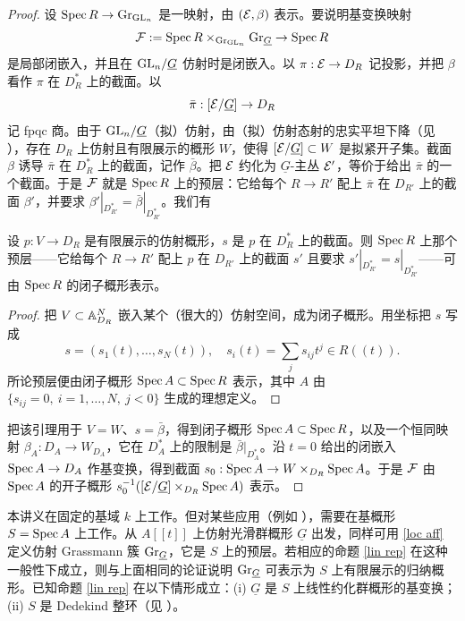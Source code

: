 \begin{proof}
设 $\operatorname{Spec} R\to {\operatorname{Gr}}_{{\operatorname{GL}}_n}$ 是一映射，由 $({\mathcal E},\beta)$ 表示。要说明基变换映射
\[
{\mathcal F}:=\operatorname{Spec} R\times_{{\operatorname{Gr}}_{{\operatorname{GL}}_n}}{\operatorname{Gr}}_{\underline G}\to \operatorname{Spec} R
\]
是局部闭嵌入，并且在 ${\operatorname{GL}}_n/\underline G$ 仿射时是闭嵌入。以 $\pi:{\mathcal E}\to D_R$ 记投影，并把 $\beta$ 看作 $\pi$ 在 $D^*_R$ 上的截面。以
\[
\bar\pi:[{\mathcal E}/\underline G]\to D_R
\]
记 fpqc 商。由于 ${\operatorname{GL}}_n/\underline G$（拟）仿射，由（拟）仿射态射的忠实平坦下降（见 \cite[Tag0244, Tag0246]{St}），存在 $D_R$ 上仿射且有限展示的概形 $W$，使得 $[{\mathcal E}/\underline G]\subset W$ 是拟紧开子集。截面 $\beta$ 诱导 $\bar\pi$ 在 $D^*_R$ 上的截面，记作 $\bar\beta$。把 ${\mathcal E}$ 约化为 $\underline G$-主丛 ${\mathcal E}'$，等价于给出 $\bar\pi$ 的一个截面。于是 ${\mathcal F}$ 就是 $\operatorname{Spec} R$ 上的预层：它给每个 $R\to R'$ 配上 $\bar\pi$ 在 $D_{R'}$ 上的截面 $\beta'$，并要求 $\beta'|_{D^*_{R'}}=\bar\beta|_{D^*_{R'}}$。我们有

\begin{lem}
设 $p:V\to D_R$ 是有限展示的仿射概形，$s$ 是 $p$ 在 $D_R^*$ 上的截面。则 $\operatorname{Spec} R$ 上那个预层——它给每个 $R\to R'$ 配上 $p$ 在 $D_{R'}$ 上的截面 $s'$ 且要求 $s'|_{D^*_{R'}}=s|_{D^*_{R'}}$——可由 $\operatorname{Spec} R$ 的闭子概形表示。
\end{lem}

\begin{proof}
把 $V\subset {\mathbb A}^N_{D_R}$ 嵌入某个（很大的）仿射空间，成为闭子概形。用坐标把 $s$ 写成
\[
s=(s_1(t),\ldots,s_N(t)),\quad s_i(t)=\sum_j s_{ij}t^{j}\in R((t)).
\]
所论预层便由闭子概形 $\operatorname{Spec} A\subset \operatorname{Spec} R$ 表示，其中 $A$ 由 $\{s_{ij}=0,\ i=1,\ldots,N,\ j<0\}$ 生成的理想定义。
\end{proof}

把该引理用于 $V=W$、$s=\bar\beta$，得到闭子概形 $\operatorname{Spec} A\subset\operatorname{Spec} R$，以及一个恒同映射 $\beta_A: D_A\to W_{D_A}$，它在 $D_A^*$ 上的限制是 $\bar\beta|_{D^*_A}$。沿 $t=0$ 给出的闭嵌入 $\operatorname{Spec} A\to D_A$ 作基变换，得到截面 $s_0:\operatorname{Spec} A\to W\times_{D_R}\operatorname{Spec} A$。于是 ${\mathcal F}$ 由 $\operatorname{Spec} A$ 的开子概形 $s_0^{-1}([{\mathcal E}/\underline G]\times_{D_R}\operatorname{Spec} A)$ 表示。
\end{proof}

\begin{rmk}\label{general base}
本讲义在固定的基域 $k$ 上工作。但对某些应用（例如 \cite{PR2,PZ}），需要在基概形 $S=\operatorname{Spec} A$ 上工作。从 $A[[t]]$ 上仿射光滑群概形 $\underline G$ 出发，同样可用 \eqref{loc aff} 定义仿射 Grassmann 簇 ${\operatorname{Gr}}_{\underline G}$，它是 $S$ 上的预层。若相应的命题 \ref{lin rep} 在这种一般性下成立，则与上面相同的论证说明 ${\operatorname{Gr}}_{\underline G}$ 可表示为 $S$ 上有限展示的归纳概形。已知命题 \ref{lin rep} 在以下情形成立：(i) $\underline G$ 是 $S$ 上线性约化群概形的基变换；(ii) $S$ 是 Dedekind 整环（见 \cite[Appendix]{PZ}）。
\end{rmk}

